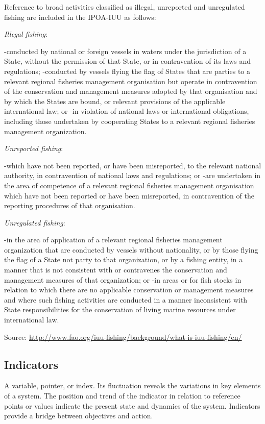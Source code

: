 \documentclass[
  11pt,
]{book}
\begin{document}
Reference to broad activities classified as illegal, unreported and unregulated fishing are included in the IPOA-IUU as follows:

\emph{Illegal fishing}:

-conducted by national or foreign vessels in waters under the jurisdiction of a State, without the permission of that State, or in contravention of its laws and regulations;
-conducted by vessels flying the flag of States that are parties to a relevant regional fisheries management organisation but operate in contravention of the conservation and management measures adopted by that organisation and by which the States are bound, or relevant provisions of the applicable international law; or
-in violation of national laws or international obligations, including those undertaken by cooperating States to a relevant regional fisheries management organization.

\emph{Unreported fishing}:

-which have not been reported, or have been misreported, to the relevant national authority, in contravention of national laws and regulations; or
-are undertaken in the area of competence of a relevant regional fisheries management organisation which have not been reported or have been misreported, in contravention of the reporting procedures of that organisation.

\emph{Unregulated fishing}:

-in the area of application of a relevant regional fisheries management organization that are conducted by vessels without nationality, or by those flying the flag of a State not party to that organization, or by a fishing entity, in a manner that is not consistent with or contravenes the conservation and management measures of that organization; or
-in areas or for fish stocks in relation to which there are no applicable conservation or management measures and where such fishing activities are conducted in a manner inconsistent with State responsibilities for the conservation of living marine resources under international law.

Source: \url{http://www.fao.org/iuu-fishing/background/what-is-iuu-fishing/en/}

\hypertarget{indicators}{%
\subsection{Indicators}\label{indicators}}

A variable, pointer, or index. Its fluctuation reveals the variations in key elements of a system. The position and trend of the indicator in relation to reference points or values indicate the present state and dynamics of the system. Indicators provide a bridge between objectives and action.
\end{document}
